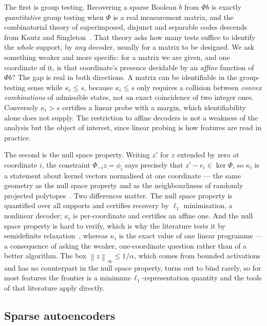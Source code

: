 \documentclass[preprint,12pt]{elsarticle}
\theoremstyle{definition}
\newcommand{\norm}[1]{\left\lVert #1 \right\rVert}
\begin{document}
The first is group testing. Recovering a sparse Boolean $b$ from $\Phi b$ is exactly
\emph{quantitative} group testing when $\Phi$ is a real measurement matrix, and the combinatorial
theory of superimposed, disjunct and separable codes descends from Kautz and
Singleton~\cite{kautz1964superimposed}. That theory asks how many tests suffice to identify the
\emph{whole} support, by \emph{any} decoder, usually for a matrix to be designed. We ask something
weaker and more specific: for a matrix we are given, and one coordinate of it, is that coordinate's
presence decidable by an \emph{affine} function of $\Phi b$? The gap is real in both directions.
A matrix can be identifiable in the group-testing sense while $\kappa_i\le s$, because
$\kappa_i\le s$ only requires a collision between \emph{convex combinations} of admissible states,
not an exact coincidence of two integer ones. Conversely $\kappa_i>s$ certifies a linear probe
with a margin, which identifiability alone does not supply. The restriction to affine decoders is
not a weakness of the analysis but the object of interest, since linear probing is how features
are read in practice.

The second is the null space property. Writing $z'$ for $z$ extended by zero at coordinate $i$,
the constraint $\Phi_{-i}z=\phi_i$ says precisely that $z'-e_i\in\ker\Phi$, so $\kappa_i$ is a
statement about kernel vectors normalised at one coordinate --- the same geometry as the null
space property and as the neighbourliness of randomly projected
polytopes~\cite{donoho2005neighborliness}. Two differences matter. The null space property is
quantified over all supports and certifies recovery by $\ell_1$ minimisation, a nonlinear decoder;
$\kappa_i$ is per-coordinate and certifies an affine one. And the null space property is hard to
verify, which is why the literature tests it by semidefinite
relaxation~\cite{daspremont2011nullspace}, whereas $\kappa_i$ is the exact value of one linear
programme --- a consequence of asking the weaker, one-coordinate question rather than of a better
algorithm. The box $\norm{z}_\infty\le1/\alpha$, which comes from bounded activations and has no
counterpart in the null space property, turns out to bind rarely, so for most features the
frontier is a minimum-$\ell_1$-representation quantity and the tools of that literature apply
directly.

\subsection{Sparse autoencoders}
\end{document}
